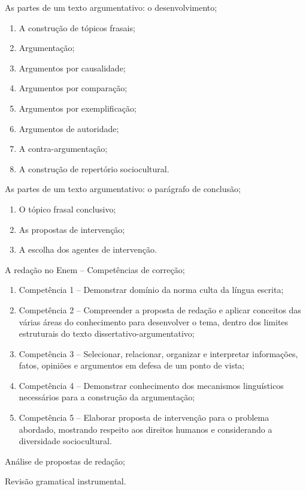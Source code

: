 \begin{pud}
\begin{description}[itemsep=0em]
	    \item[UNIDADE III:]  As partes de um texto argumentativo: o desenvolvimento;
  			\begin{enumerate}[itemsep=0em, topsep=0em]
                \item A construção de tópicos frasais;
                \item Argumentação;
                \item  Argumentos por causalidade;
                \item Argumentos por comparação;
                \item Argumentos por exemplificação;
                \item  Argumentos de autoridade;
                \item A contra-argumentação;
                \item A construção de repertório sociocultural.
            \end{enumerate}
	    \item[UNIDADE IV:]  As partes de um texto argumentativo: o parágrafo de conclusão;
	         \begin{enumerate}[itemsep=0em, topsep=0em]                
				\item O tópico frasal conclusivo;
                \item As propostas de intervenção;
                \item A escolha dos agentes de intervenção.
            \end{enumerate}
	    \item[UNIDADE V:]  A redação no Enem -- Competências de correção;
	         \begin{enumerate}[itemsep=0em, topsep=0em]                
                \item Competência 1 -- Demonstrar domínio da norma culta da língua escrita;
                \item Competência 2 -- Compreender a proposta de redação e aplicar conceitos das várias áreas do conhecimento para desenvolver o tema, dentro dos limites estruturais do texto dissertativo-argumentativo;
                \item Competência 3 -- Selecionar, relacionar, organizar e interpretar informações, fatos, opiniões e argumentos em defesa de um ponto de vista;
                \item Competência 4 -- Demonstrar conhecimento dos mecanismos linguísticos necessários para a construção da argumentação;
                \item Competência 5 -- Elaborar proposta de intervenção para o problema abordado, mostrando respeito aos direitos humanos e considerando a diversidade sociocultural.
            \end{enumerate}
	    \item[UNIDADE VI:] Análise de propostas de redação;
	    \item[UNIDADE VII:]  Revisão gramatical instrumental.
	\end{description}
	

\end{pud}
